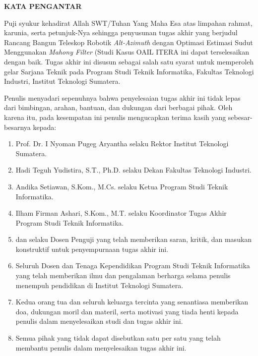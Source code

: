 \clearpage
{}%

\begin{justifying}
	\large \bfseries \centering \MakeUppercase{Kata Pengantar}\linebreak
	
	\normalsize \normalfont \justifying

	Puji syukur kehadirat Allah SWT/Tuhan Yang Maha Esa atas limpahan rahmat, karunia, serta petunjuk-Nya sehingga penyusunan tugas akhir yang berjudul Rancang Bangun Teleskop Robotik \textit{Alt-Azimuth} dengan Optimasi Estimasi Sudut Menggunakan \textit{Mahony Filter} (Studi Kasus OAIL ITERA ini dapat terselesaikan dengan baik. Tugas akhir ini disusun sebagai salah satu syarat untuk memperoleh gelar Sarjana Teknik pada Program Studi Teknik Informatika, Fakultas Teknologi Industri, Institut Teknologi Sumatera. \par
	
	Penulis menyadari sepenuhnya bahwa penyelesaian tugas akhir ini tidak lepas dari bimbingan, arahan, bantuan, dan dukungan dari berbagai pihak. Oleh karena itu, pada kesempatan ini penulis mengucapkan terima kasih yang sebesar-besarnya kepada: \par
	\begin{enumerate}
		\item {Prof. Dr. I Nyoman Pugeg Aryantha} selaku Rektor Institut Teknologi Sumatera.  
		\item {Hadi Teguh Yudistira, S.T., Ph.D.} selaku Dekan Fakultas Teknologi Industri.
		\item {Andika Setiawan, S.Kom., M.Cs.} selaku Ketua Program Studi Teknik Informatika.
		\item {Ilham Firman Ashari, S.Kom., M.T.} selaku Koordinator Tugas Akhir Program Studi Teknik Informatika.
		\item \printnamapengujia dan \printnamapengujib selaku Dosen Penguji yang telah memberikan saran, kritik, dan masukan konstruktif untuk penyempurnaan tugas akhir ini.
		\item Seluruh Dosen dan Tenaga Kependidikan Program Studi Teknik Informatika yang telah memberikan ilmu dan pengalaman berharga selama penulis menempuh pendidikan di Institut Teknologi Sumatera.
		\item Kedua orang tua dan seluruh keluarga tercinta yang senantiasa memberikan doa, dukungan moril dan materil, serta motivasi yang tiada henti kepada penulis dalam menyelesaikan studi dan tugas akhir ini.
		\item Semua pihak yang tidak dapat disebutkan satu per satu yang telah membantu penulis dalam menyelesaikan tugas akhir ini.
	\end{enumerate} \par
	

\end{justifying}
